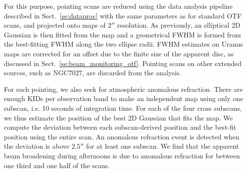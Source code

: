For this purpose, pointing scans are reduced using
the data analysis pipeline described in
Sect.~\ref{se:dataproc} with the same parameters as for
standard OTF scans, and projected onto maps of $2''$ resolution.
As previously, an elliptical 2D Gaussian is then fitted from the map
and a geometrical FWHM is formed from the best-fitting FWHM along the
two ellipse radii. FWHM estimates on Uranus maps are corrected for an
offset due to the finite size of the apparent disc, as discussed in
Sect.~\ref{se:beam_monitoring_otf}. Pointing scans on other extended
sources, such as NGC7027, are discarded from the analysis.

For each pointing, we also seek for atmospheric anomalous refraction. There are
enough KIDs per observation band to make an independent map using only
one subscan, i.e. 10 seconds of integration time.
For each of the four cross subscans, we thus estimate the position of the best
2D Gaussian that fits the map. We compute the deviation between each
subscan-derived position and the best-fit position using the entire
scan. An anomalous refraction event is detected when the deviation is
above $2.5''$ for at least one subscan. We find that the apparent beam
broadening during afternoons is due to anomalous refraction for
between one third and one half of the scans.%

